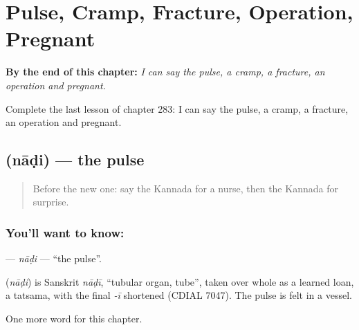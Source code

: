 
\chapter{Pulse, Cramp, Fracture, Operation, Pregnant}
\label{ch:ka-pulse-cramp-fracture-operation-pregnant}

\begin{chapteropening}
\textbf{By the end of this chapter:} \emph{I can say the pulse, a cramp, a fracture, an operation and pregnant.}

Complete the last lesson of chapter 283: I can say the pulse, a cramp, a fracture, an operation and pregnant.
\end{chapteropening}

\section[\texorpdfstring{\kn{ನಾಡಿ} (nāḍi)}{ನಾಡಿ (nāḍi)}]{ (nāḍi) — the pulse}

\label{lesson:KA-C283-nadi}



\begin{quote}
Before the new one: say the Kannada for a nurse, then the Kannada for surprise.
\end{quote}

\subsection*{You'll want to know: }
\textbf{} — \emph{nāḍi} — \textquotedblleft{}the pulse\textquotedblright{}.

\begin{cousinweb}
\textbf{} (\emph{nāḍi}) is Sanskrit \emph{nāḍī}, \textquotedblleft{}tubular organ, tube\textquotedblright{}, taken over whole as a learned loan, a tatsama, with the final \emph{-ī} shortened (CDIAL 7047). The pulse is felt in a vessel.
\end{cousinweb}

\begin{grammarlens}[title={What you've built}]
One more word for this chapter.
\end{grammarlens}

